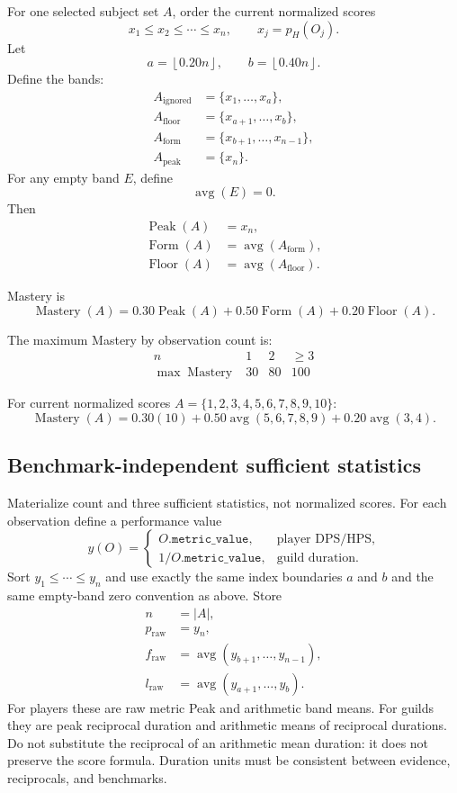 \documentclass[11pt]{article}
\newcommand{\field}[1]{\texttt{#1}}
\begin{document}
For one selected subject set $A$, order the current normalized scores
\[
  x_1\le x_2\le\cdots\le x_n,
  \qquad x_j=p_H(O_j).
\]
Let
\[
  a=\left\lfloor0.20n\right\rfloor,
  \qquad
  b=\left\lfloor0.40n\right\rfloor.
\]
Define the bands:
\[
\begin{aligned}
A_{\mathrm{ignored}} &= \{x_1,\ldots,x_a\},\\
A_{\mathrm{floor}} &= \{x_{a+1},\ldots,x_b\},\\
A_{\mathrm{form}} &= \{x_{b+1},\ldots,x_{n-1}\},\\
A_{\mathrm{peak}} &= \{x_n\}.
\end{aligned}
\]
For any empty band $E$, define
\[
  \operatorname{avg}(E)=0.
\]
Then
\[
\begin{aligned}
\operatorname{Peak}(A) &= x_n,\\
\operatorname{Form}(A) &= \operatorname{avg}(A_{\mathrm{form}}),\\
\operatorname{Floor}(A) &= \operatorname{avg}(A_{\mathrm{floor}}).
\end{aligned}
\]

Mastery is
\[
  \operatorname{Mastery}(A)
  =0.30\operatorname{Peak}(A)
  +0.50\operatorname{Form}(A)
  +0.20\operatorname{Floor}(A).
\]

The maximum Mastery by observation count is:
\[
\begin{array}{c|ccc}
n & 1 & 2 & \ge 3\\
\hline
\max\operatorname{Mastery} & 30 & 80 & 100
\end{array}
\]

For current normalized scores $A=\{1,2,3,4,5,6,7,8,9,10\}$:
\[
  \operatorname{Mastery}(A)
  =0.30(10)+0.50\operatorname{avg}(5,6,7,8,9)
  +0.20\operatorname{avg}(3,4).
\]

\subsection{Benchmark-independent sufficient statistics}
Materialize count and three sufficient statistics, not normalized scores. For each observation define a performance value
\[
 y(O)=\begin{cases}
 O.\field{metric\_value}, & \text{player DPS/HPS},\\
 1/O.\field{metric\_value}, & \text{guild duration}.
 \end{cases}
\]
Sort $y_1\le\cdots\le y_n$ and use exactly the same index boundaries $a$ and $b$ and the same empty-band zero convention as above. Store
\[
\begin{aligned}
 n&=\lvert A\rvert,\\
 p_{\mathrm{raw}}&=y_n,\\
 f_{\mathrm{raw}}&=\operatorname{avg}(y_{b+1},\ldots,y_{n-1}),\\
 l_{\mathrm{raw}}&=\operatorname{avg}(y_{a+1},\ldots,y_b).
\end{aligned}
\]
For players these are raw metric Peak and arithmetic band means. For guilds they are peak reciprocal duration and arithmetic means of reciprocal durations. Do not substitute the reciprocal of an arithmetic mean duration: it does not preserve the score formula. Duration units must be consistent between evidence, reciprocals, and benchmarks.
\end{document}
